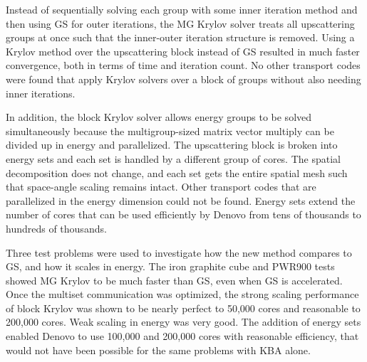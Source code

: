 Instead of sequentially solving each group with some inner iteration method and then using GS for outer iterations, the MG Krylov solver treats all upscattering groups at once such that the inner-outer iteration structure is removed. Using a Krylov method over the upscattering block instead of GS resulted in much faster convergence, both in terms of time and iteration count. No other transport codes were found that apply Krylov solvers over a block of groups without also needing inner iterations. 

In addition, the block Krylov solver allows energy groups to be solved simultaneously because the multigroup-sized matrix vector multiply can be divided up in energy and parallelized. The upscattering block is broken into energy sets and each set is handled by a different group of cores. The spatial decomposition does not change, and each set gets the entire spatial mesh such that space-angle scaling remains intact.  Other \Sn transport codes that are parallelized in the energy dimension could not be found. Energy sets extend the number of cores that can be used efficiently by Denovo from tens of thousands to hundreds of thousands. 

Three test problems were used to investigate how the new method compares to GS, and how it scales in energy. The iron graphite cube and PWR900 tests showed MG Krylov to be much faster than GS, even when GS is accelerated. Once the multiset communication was optimized, the strong scaling performance of block Krylov was shown to be nearly perfect to 50,000 cores and reasonable to 200,000 cores. Weak scaling in energy was very good. The addition of energy sets enabled Denovo to use 100,000 and 200,000 cores with reasonable efficiency, that would not have been possible for the same problems with KBA alone. 



